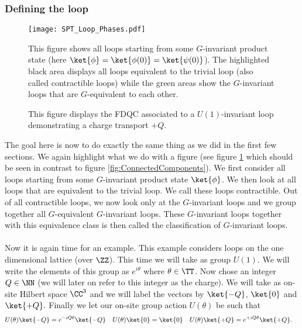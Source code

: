 \subsubsection{Defining the loop}
\begin{figure}
	\centering
	\texttt{[image: SPT\_Loop\_Phases.pdf]}
	\caption{This figure shows all loops starting from some $G$-invariant product state (here $\ket{\phi}=\ket{\phi(0)}=\ket{\psi(0)}$). The highlighted black area displays all loops equivalent to the trivial loop (also called contractible loops) while the green areas show the $G$-invariant loops that are $G$-equivalent to each other.}
	\label{fig:ConnectedComponentsLoops}
\end{figure}
\begin{figure}
	\centering
	\scalebox{0.78}{
	
	}
	\caption{This figure displays the FDQC associated to a $U(1)$-invariant loop demonstrating a charge transport $+Q$.}
	\label{fig:U1_ThoulessPumpAs_FiniteDepthQuantumCircuit}
\end{figure}
The goal here is now to do exactly the same thing as we did in the first few sections. We again highlight what we do with a figure (see figure \ref{fig:ConnectedComponentsLoops} which should be seen in contrast to figure \ref{fig:ConnectedComponents}). We first consider all loops starting from some $G$-invariant product state $\ket{\phi}$. We then look at all loops that are equivalent to the trivial loop. We call these loops contractible. Out of all contractible loops, we now look only at the $G$-invariant loops and we group together all $G$-equivalent $G$-invariant loops. These $G$-invariant loops together with this equivalence class is then called the classification of $G$-invariant loops.\\\\
Now it is again time for an example. This example considers loops on the one dimensional lattice (over $\ZZ$). This time we will take as group $U(1)$. We will write the elements of this group as $e^{i\theta}$ where $\theta\in\TT$. Now chose an integer $Q\in\NN$ (we will later on refer to this integer as the charge). We will take as on-site Hilbert space $\CC^3$ and we will label the vectors by $\ket{-Q}$, $\ket{0}$ and $\ket{+Q}.$ Finally we let our on-site group action $U(\theta)$ be such that
\begin{align}
	U(\theta)\ket{-Q}&=e^{-i Q\theta}\ket{-Q}&U(\theta)\ket{0}&=\ket{0}&U(\theta)\ket{+Q}&=e^{+iQ\theta}\ket{+Q}.
\end{align}
